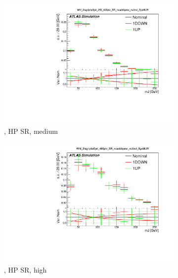 \begin{figure}[!htbp]
  \centering
  \begin{subfigure}{.5\textwidth}
    \includegraphics[width=\textwidth]{chapters/6.vhbb_boosted/figs/0L_Whf_2tag1pfat0jet_250_400ptv_SR_noaddbjetsr_mJIncl_SysMUR.pdf}
    \caption{\Whf, HP SR, medium \pTV}
    \label{fig:Vjets_SysMUR_sub1}
  \end{subfigure}%
  \hfill
  \begin{subfigure}{.5\textwidth}
    \includegraphics[width=\textwidth]{chapters/6.vhbb_boosted/figs/0L_Whf_2tag1pfat0jet_400ptv_SR_noaddbjetsr_mJIncl_SysMUR.pdf}
    \caption{\Whf, HP SR, high \pTV}
    \label{fig:Vjets_SysMUR_sub2}
  \end{subfigure}
  \begin{subfigure}{.5\textwidth}

\end{subfigure}
\end{figure}
